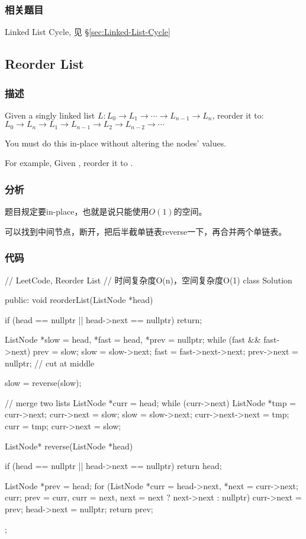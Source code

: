 \subsubsection{相关题目}
\begindot
\item Linked List Cycle, 见 \S \ref{sec:Linked-List-Cycle}
\myenddot


\subsection{Reorder List}
\label{sec:Reorder-List}


\subsubsection{描述}
Given a singly linked list $L: L_0 \rightarrow L_1 \rightarrow \cdots \rightarrow L_{n-1} \rightarrow L_n$,
reorder it to: $L_0 \rightarrow L_n \rightarrow L_1 \rightarrow L_{n-1} \rightarrow L_2 \rightarrow L_{n-2} \rightarrow \cdots$

You must do this in-place without altering the nodes' values.

For example,
Given , reorder it to .


\subsubsection{分析}
题目规定要in-place，也就是说只能使用$O(1)$的空间。

可以找到中间节点，断开，把后半截单链表reverse一下，再合并两个单链表。


\subsubsection{代码}
\begin{Code}
// LeetCode, Reorder List
// 时间复杂度O(n)，空间复杂度O(1)
class Solution {
public:
    void reorderList(ListNode *head) {
        if (head == nullptr || head->next == nullptr) return;

        ListNode *slow = head, *fast = head, *prev = nullptr;
        while (fast && fast->next) {
            prev = slow;
            slow = slow->next;
            fast = fast->next->next;
        }
        prev->next = nullptr; // cut at middle

        slow = reverse(slow);

        // merge two lists
        ListNode *curr = head;
        while (curr->next) {
            ListNode *tmp = curr->next;
            curr->next = slow;
            slow = slow->next;
            curr->next->next = tmp;
            curr = tmp;
        }
        curr->next = slow;
    }

    ListNode* reverse(ListNode *head) {
        if (head == nullptr || head->next == nullptr) return head;

        ListNode *prev = head;
        for (ListNode *curr = head->next, *next = curr->next; curr;
            prev = curr, curr = next, next = next ? next->next : nullptr) {
                curr->next = prev;
        }
        head->next = nullptr;
        return prev;
    }
};
\end{Code}


